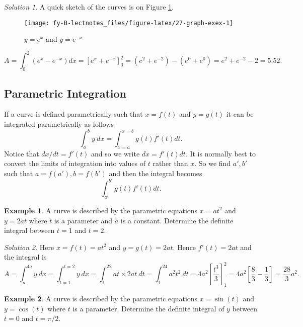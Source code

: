 \documentclass[
  11pt,
  oneside]{book}
\newcommand{\slide}{}
\theoremstyle{definition}
\theoremstyle{definition}
\newtheorem{example}{Example}[chapter]
\theoremstyle{definition}
\theoremstyle{definition}
\theoremstyle{remark}
\newtheorem*{solution}{Solution}
\begin{document}
\begin{solution}
\leavevmode

A quick sketch of the curves is on Figure \ref{fig:27-graph-exex}.

\begin{figure}

{\centering \texttt{[image: fy-B-lectnotes\_files/figure-latex/27-graph-exex-1]} 

}

\caption{$y=e^x$ and $y=e^{-x}$}\label{fig:27-graph-exex}
\end{figure}

\[
A = \int_0^2(e^x-e^{-x})dx = \left[e^x+e^{-x}\right]_0^2 = (e^2+e^{-2})-(e^0+e^0) = e^2+e^{-2}-2=5.52.
\]

\end{solution}

\slide

\subsection{Parametric Integration}\label{parametric-integration}

If a curve is defined parametrically such that \(x = f(t)\) and \(y = g(t)\) it can be integrated parametrically as follows
\[
\int_a^by\ dx = \int_{x=a}^{x=b}g(t)f'(t)dt.
\]
Notice that \(dx/dt = f'(t)\) and so we write \(dx = f'(t)dt\). It is normally best to convert the limits of integration into values of \(t\) rather than \(x\). So we find \(a', b'\) such that \(a=f(a'), b = f(b')\) and then the integral becomes
\[
\int_{a'}^{b'}g(t)f'(t)dt.
\]
\slide

\begin{example}
A curve is described by the parametric equations \(x = at^2\) and \(y = 2at\) where \(t\) is a parameter and \(a\) is a constant. Determine the definite integral between \(t = 1\) and \(t = 2\).
\end{example}

\begin{solution}
Here \(x=f(t)=at^2\) and \(y=g(t)=2at\). Hence \(f'(t) = 2at\) and the integral is
\[
A = \int_a^{4a} y\ dx = \int_{t=1}^{t=2}y\ dx = \int_1^22at\times 2at\ dt = \int_1^24a^2t^2\ dt = 4a^2\left[\frac{t^3}3\right]_1^2 = 4a^2\left[\frac 83-\frac13\right]=\frac{28}3a^2.
\]
\end{solution}

\slide

\begin{example}
A curve is described by the parametric equations \(x = \sin(t)\) and \(y = \cos(t)\) where \(t\) is a parameter. Determine the definite integral of \(y\) between \(t = 0\) and \(t = \pi/2\).
\end{example}
\end{document}
